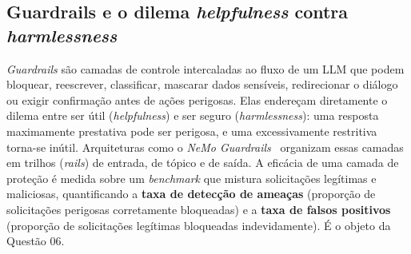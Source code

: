 \subsection{Guardrails e o dilema \textit{helpfulness} contra \textit{harmlessness}}
\label{sec:fund-guardrails}

\textit{Guardrails} são camadas de controle intercaladas ao fluxo de um LLM que
podem bloquear, reescrever, classificar, mascarar dados sensíveis, redirecionar o
diálogo ou exigir confirmação antes de ações perigosas. Elas endereçam diretamente o
dilema entre ser útil (\textit{helpfulness}) e ser seguro (\textit{harmlessness}):
uma resposta maximamente prestativa pode ser perigosa, e uma excessivamente
restritiva torna-se inútil. Arquiteturas como o \textit{NeMo
Guardrails}~\cite{rebedea2023nemo} organizam essas camadas em trilhos
(\textit{rails}) de entrada, de tópico e de saída. A eficácia de uma camada de
proteção é medida sobre um \textit{benchmark} que mistura solicitações legítimas e
maliciosas, quantificando a \textbf{taxa de detecção de ameaças} (proporção de
solicitações perigosas corretamente bloqueadas) e a \textbf{taxa de falsos
positivos} (proporção de solicitações legítimas bloqueadas indevidamente). É o objeto
da Questão 06.

